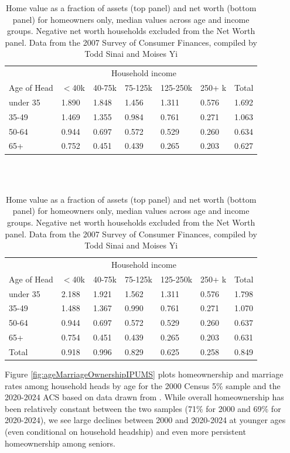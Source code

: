 \documentclass[12pt]{article}
\begin{document}
\begin{table}
	\caption{\label{tab:assets} Home value as a fraction of assets (top
	panel) and net worth (bottom panel) for homeowners only, median
	values across age and income groups.  Negative net worth households
	excluded from the Net Worth panel.  Data from the 2007 Survey of
	Consumer Finances, compiled by Todd Sinai and Moises Yi}
	\begin{tabular}{l|llllll}
		\hline
		&                   \multicolumn{5}{c}{Household income}\\ 
		Age of Head      &     $<$40k    & 40-75k   &75-125k  &125-250k    &250+ k
		&Total\\
		\hline\hline
		 under 35& 1.890& 1.848& 1.456& 1.311& 0.576& 1.692\\
		 35-49& 1.469& 1.355& 0.984& 0.761& 0.271& 1.063\\
		 50-64& 0.944& 0.697& 0.572& 0.529& 0.260& 0.634\\
		 65+& 0.752& 0.451& 0.439& 0.265& 0.203& 0.627\\
		\hline
	\end{tabular}
	\\
	\\
	\begin{tabular}{l|llllll}
		\hline
		&                   \multicolumn{5}{c}{Household income}\\ 
		Age of Head      &     $<$40k    & 40-75k   &75-125k  &125-250k    &250+ k
		&Total\\
		\hline\hline
		 under 35 &2.188& 1.921& 1.562& 1.311& 0.576& 1.798\\
		35-49 &1.488& 1.367& 0.990& 0.761& 0.271& 1.070\\
		50-64 &0.944& 0.697& 0.572& 0.529& 0.260& 0.637\\
		  65+ &0.754& 0.451& 0.439& 0.265& 0.203& 0.631\\
		Total &0.918& 0.996& 0.829& 0.625& 0.258& 0.849\\
		\hline
	\end{tabular}
\end{table}

Figure \ref{fig:ageMarriageOwnershipIPUMS} plots homeownership and marriage
rates among household heads by age for the 2000 Census 5\% sample and the
2020-2024 ACS based on data drawn from \textcite{IPUMS}.  While overall homeownership
has been relatively constant between the two samples (71\% for 2000 and 69\%
for 2020-2024), we see large declines between 2000 and 2020-2024 at younger
ages (even conditional on household headship) and even more persistent
homeownership among seniors. 
\end{document}
